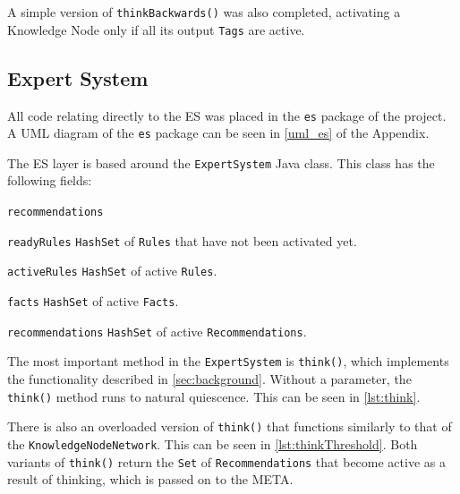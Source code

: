 \documentclass[titlepage,11pt]{article}
\def \espath {"C:/Users/Sean/IdeaProjects/Prometheus/src/es/ExpertSystem.java"}
\def \knnpath {"C:/Users/Sean/IdeaProjects/Prometheus/src/knn/KnowledgeNodeNetwork.java"}
\newcommand{\ar}[1]{\autoref{#1}}
\newcommand{\code}[1]{\texttt{#1}}
\begin{document}


A simple version of \code{thinkBackwards()} was also completed, activating a Knowledge Node only if all its output \code{Tags} are active.

\subsection{Expert System}

All code relating directly to the ES was placed in the \code{es} package of the project. A UML diagram of the \code{es} package can be seen in \autoref{uml_es} of the Appendix.

The ES layer is based around the \code{ExpertSystem} Java class. This class has the following fields:

\begin{labeling}{\code{recommendations}}
	\item[\code{readyRules}] \code{HashSet} of \code{Rules} that have not been activated yet.
	\item[\code{activeRules}] \code{HashSet} of active \code{Rules}.
	\item[\code{facts}] \code{HashSet} of active \code{Facts}.
	\item[\code{recommendations}] \code{HashSet} of active \code{Recommendations}.
\end{labeling}

The most important method in the \code{ExpertSystem} is \code{think()}, which implements the functionality described in \ar{sec:background}. Without a parameter, the \code{think()} method runs to natural quiescence. This can be seen in \autoref{lst:think}.



There is also an overloaded version of \code{think()} that functions similarly to that of the \code{KnowledgeNodeNetwork}. This can be seen in \autoref{lst:thinkThreshold}. Both variants of \code{think()} return the \code{Set} of \code{Recommendations} that become active as a result of thinking, which is passed on to the META.


\end{document}
